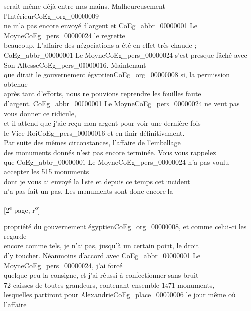 \documentclass{book}
\begin{document}
serait même déjà entre mes mains. Malheureusement l’Intérieur\gls{CoEg_org_00000009}\\
ne m’a pas encore envoyé d’argent et \gls{CoEg_abbr_00000001} Le Moyne\gls{CoEg_pers_00000024} le regrette\\
beaucoup. L’affaire des négociations a été en effet très-chaude ;\\
\gls{CoEg_abbr_00000001} Le Moyne\gls{CoEg_pers_00000024} s’est presque fâché avec Son Altesse\gls{CoEg_pers_00000016}. Maintenant\\
que dirait le gouvernement égyptien\gls{CoEg_org_00000008} si, la permission obtenue\\
après tant d’efforts, nous ne pouvions reprendre les fouilles faute\\
d’argent. \gls{CoEg_abbr_00000001} Le Moyne\gls{CoEg_pers_00000024} ne veut pas vous donner ce ridicule,\\
et il attend que j’aie reçu mon argent pour voir une dernière fois\\
le Vice-Roi\gls{CoEg_pers_00000016} et en finir définitivement.\\
\indent Par suite des mêmes circonstances, l’affaire de l’emballage\\
des monuments donnés n’est pas encore terminée. Vous vous rappelez\\
que \gls{CoEg_abbr_00000001} Le Moyne\gls{CoEg_pers_00000024} n’a pas voulu accepter les 515 monuments\\
dont je vous ai envoyé la liste et depuis ce temps cet incident\\
n’a pas fait un pas. Les monuments sont donc encore la
{\footnotesize \begin{center} [2\textsuperscript{e} page, r\textsuperscript{o}]\end{center}}
\noindent propriété du gouvernement égyptien\gls{CoEg_org_00000008}, et comme celui-ci les regarde\\
encore comme tels, je n’ai pas, jusqu’à un certain point, le droit\\
d’y toucher. Néanmoins d’accord avec \gls{CoEg_abbr_00000001} Le Moyne\gls{CoEg_pers_00000024}, j’ai forcé\\
quelque peu la consigne, et j’ai réussi à confectionner sans bruit\\
72 caisses de toutes grandeurs, contenant ensemble 1471 monuments,\\
lesquelles partiront pour Alexandrie\gls{CoEg_place_00000006} le jour même où l’affaire\\
\end{document}
